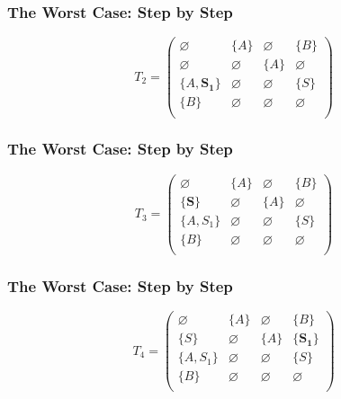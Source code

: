\documentclass[xcolor=table]{beamer}
\begin{document}
\begin{frame}[noframenumbering]
  \transwipe[direction=90]
  \frametitle{The Worst Case: Step by Step}
\begin{figure}[h]
\[ 
T_2 = \begin{pmatrix}
    \varnothing & \{A\}       & \varnothing & \{B\}       \\
    \varnothing & \varnothing & \{A\}       & \varnothing \\
    \{A, \pmb{S_1}\}  & \varnothing & \varnothing & \{S\}       \\
    \{B\}       & \varnothing & \varnothing & \varnothing \\
\end{pmatrix}
\]
\label{ExampleQueryFirstIteration}
\end{figure}
\end{frame} 

\begin{frame}[noframenumbering]
  \transwipe[direction=90]
  \frametitle{The Worst Case: Step by Step}
\begin{figure}[h]
\[
T_3 = \begin{pmatrix}
\varnothing & \{A\}       & \varnothing & \{B\}       \\
\{\pmb{S}\}       & \varnothing & \{A\}       & \varnothing \\
\{A, S_1\}  & \varnothing & \varnothing & \{S\}       \\
\{B\}       & \varnothing & \varnothing & \varnothing \\
\end{pmatrix}
\]
\label{ExampleQueryFirstIteration}
\end{figure}
\end{frame} 

\begin{frame}[noframenumbering]
  \transwipe[direction=90]
  \frametitle{The Worst Case: Step by Step}
\begin{figure}[h]
\[
T_4 = \begin{pmatrix}
\varnothing & \{A\}       & \varnothing & \{B\}       \\
\{S\}       & \varnothing & \{A\}       & \{\pmb{S_1}\}     \\
\{A, S_1\}  & \varnothing & \varnothing & \{S\}       \\
\{B\}       & \varnothing & \varnothing & \varnothing \\
\end{pmatrix}
\]
\label{ExampleQueryFirstIteration}
\end{figure}
\end{frame} 
\end{document}
